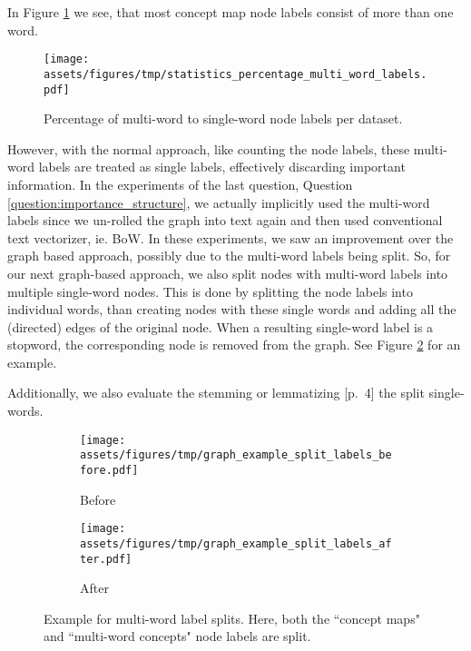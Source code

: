 In Figure \ref{fig:statistics_percentage_multi_word_labels} we see, that most concept map node labels consist of more than one word.

\begin{figure}[htb!]
    \centering
    \texttt{[image: assets/figures/tmp/statistics\_percentage\_multi\_word\_labels.pdf]}
    \caption[Statistics: Percentage multi-word node labels]{Percentage of multi-word to single-word node labels per dataset.}\label{fig:statistics_percentage_multi_word_labels}
\end{figure}

However, with the normal approach, like counting the node labels, these multi-word labels are treated as single labels, effectively discarding important information.
In the experiments of the last question, Question \ref{question:importance_structure}, we actually implicitly used the multi-word labels since we un-rolled the graph into text again and then used conventional text vectorizer, ie. BoW.
In these experiments, we saw an improvement over the graph based approach, possibly due to the multi-word labels being split.
So, for our next graph-based approach, we also split nodes with multi-word labels into multiple single-word nodes.
This is done by splitting the node labels into individual words, than creating nodes with these single words and adding all the (directed) edges of the original node.
When a resulting single-word label is a stopword, the corresponding node is removed from the graph.
See Figure \ref{fig:example_split_labels} for an example.

Additionally, we also evaluate the stemming or lemmatizing [p.~4]\cite{Manning2000} the split single-words.

\begin{figure}[htb!]
    \centering
    \begin{subfigure}[t]{.43\linewidth}  {\texttt{[image: assets/figures/tmp/graph\_example\_split\_labels\_before.pdf]}}
        \caption{Before}
    \end{subfigure}
\hspace{2cm}
    \begin{subfigure}[t]{.43\linewidth}  {\texttt{[image: assets/figures/tmp/graph\_example\_split\_labels\_after.pdf]}}
        \caption{After}
    \end{subfigure}
    \caption[Example: Multi-word node labels Splitting]{Example for multi-word label splits. Here, both the ``concept maps" and ``multi-word concepts" node labels are  split.}\label{fig:example_split_labels}
\end{figure}

